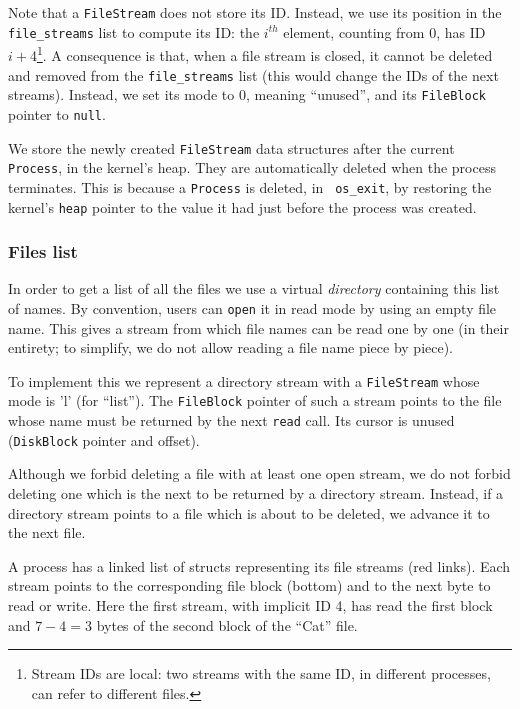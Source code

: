Note that a {\tt FileStream} does not store its ID. Instead, we use its
position in the {\tt file\_streams} list to compute its ID: the $i^{th}$
element, counting from 0, has ID $i+4$\footnote{Stream IDs are local: two
streams with the same ID, in different processes, can refer to different
files.}. A consequence is that, when a file stream is closed, it cannot be
deleted and removed from the {\tt file\_streams} list (this would change the
IDs of the next streams). Instead, we set its mode to 0, meaning ``unused'',
and its {\tt FileBlock} pointer to {\tt null}.

We store the newly created {\tt FileStream} data structures after the current
{\tt Process}, in the kernel's heap. They are automatically deleted when the
process terminates. This is because a {\tt Process} is deleted, in {\tt
os\_exit}, by restoring the kernel's {\tt heap} pointer to the value it had
just before the process was created.

\subsubsection{Files list}

In order to get a list of all the files we use a virtual {\em directory}
containing this list of names. By convention, users can {\tt open} it in read
mode by using an empty file name. This gives a stream from which file names can
be read one by one (in their entirety; to simplify, we do not allow reading a
file name piece by piece).

To implement this we represent a directory stream with a {\tt FileStream}
whose mode is 'l' (for ``list''). The {\tt FileBlock} pointer of such a stream
points to the file whose name must be returned by the next {\tt read} call. Its
cursor is unused ({\tt DiskBlock} pointer and offset).

Although we forbid deleting a file with at least one open stream, we do not
forbid deleting one which is the next to be returned by a directory stream.
Instead, if a directory stream points to a file which is about to be deleted,
we advance it to the next file.

\begin{Figure}
  

  \caption{A process has a linked list of structs representing its file streams
  (red links). Each stream points to the corresponding file block (bottom) and
  to the next byte to read or write. Here the first stream, with implicit ID 4,
  has read the first block and $7-4=3$ bytes of the second block of the ``Cat''
  file.}\label{fig:streams-data-structures}
\end{Figure}

